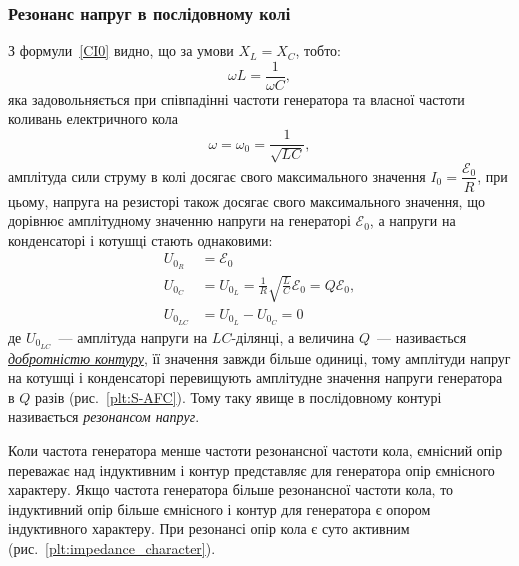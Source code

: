 \documentclass[]{LabWork}
\begin{document}
\subsubsection{Резонанс напруг в послідовному колі}

З формули~\eqref{CI0} видно, що за умови $X_L = X_C$, тобто:
\begin{equation}
	\omega L = \frac{1}{\omega C},
\end{equation}
яка задовольняється при співпадінні частоти генератора та власної частоти коливань електричного кола
\begin{equation}
	\omega = \omega_0 = \frac{1}{\sqrt{LC}},
\end{equation}
амплітуда сили струму в колі досягає свого максимального значення $I_0 = \dfrac{\mathcal{E}_0}{R}$, при цьому, напруга на резисторі також досягає свого максимального значення, що дорівнює амплітудному значенню напруги на генераторі $\mathcal{E}_0$, а напруги на конденсаторі і котушці стають однаковими:
\begin{align}
	U_{0_R}    & = \mathcal{E}_0                                                             \\
	U_{0_C}    & = U_{0_L} = \frac{1}{R} \sqrt{\frac{L}{C}} \mathcal{E}_0 = Q \mathcal{E}_0, \\
	U_{0_{LC}} & = U_{0_L} - U_{0_C} = 0 \label{ULC}
\end{align}
де $U_{0_{LC}}$~--- амплітуда напруги на $LC$-ділянці, а величина $Q$~--- називається \href{http://femto.com.ua/articles/part_1/1110.html}{\emph{добротністю контуру}}, її значення завжди більше одиниці, тому амплітуди напруг на котушці і конденсаторі перевищують  амплітудне значення напруги генератора в $Q$ разів (рис.~\ref{plt:S-AFC}). Тому таку явище в послідовному контурі називається \emph{резонансом напруг}.

Коли частота генератора менше частоти резонансної частоти кола, ємнісний опір переважає над індуктивним і контур представляє для генератора опір ємнісного характеру. Якщо частота генератора більше резонансної частоти кола, то індуктивний опір більше ємнісного і контур для генератора є опором індуктивного характеру. При резонансі опір кола є суто активним (рис.~\ref{plt:impedance_character}).
\end{document}
